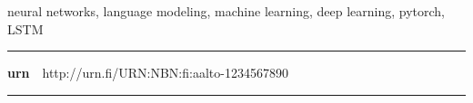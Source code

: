 \begin{spacing}{.88}
{\parindent0pt %

\parbox[t]{123.6mm}{\raggedright\small neural networks, language modeling, machine learning, deep learning, pytorch, LSTM}

\vspace{.5mm}\rule{\textwidth}{.75pt}

{\fontsize{10.5pt}{10.5pt}\bfseries\sffamily\lsstyle urn}~~{\small http://urn.fi/URN:NBN:fi:aalto-1234567890}

\vspace{-2.4mm}\rule{\textwidth}{.75pt}

} %
\end{spacing}




\newpage
{}
{}


